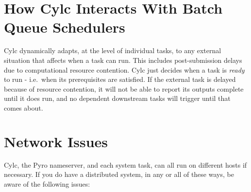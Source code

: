 \documentclass[11pt,a4paper]{article}
\begin{document}
\section{How Cylc Interacts With Batch Queue Schedulers}
\label{HowCylcInteractsWithBatchQueueSchedulers}

Cylc dynamically adapts, at the level of individual tasks, to any
external situation that affects when a task can run. This includes
post-submission delays due to computational resource contention. Cylc
just decides when a task is {\em ready} to run - i.e.\ when its
prerequisites are satisfied.  If the external task is delayed because of
resource contention, it will not be able to report its outputs complete
until it does run, and no dependent downstream tasks will trigger until
that comes about.



\section{Network Issues}

Cylc, the Pyro nameserver, and each system task, can all run on
different hosts if necessary.  If you do have a distributed system, in 
any or all of these ways, be aware of the following issues: 
\end{document}
